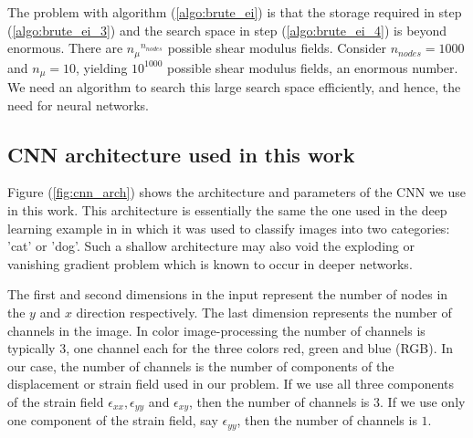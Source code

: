 \documentclass[12pt]{article}
\begin{document}
\vspace{4mm}
The problem with algorithm (\ref{algo:brute_ei}) is that the storage required in step (\ref{algo:brute_ei_3}) and the search space in step (\ref{algo:brute_ei_4}) is beyond enormous. There are ${n_{\mu}}^{n_{nodes}}$ possible shear modulus fields. Consider $n_{nodes}=1000$ and $n_{\mu}=10$, yielding $10^{1000}$ possible shear modulus fields, an enormous number. We need an algorithm to search this large search space efficiently, and hence, the need for neural networks.
\subsection{\label{sect:cnnarch} CNN architecture used in this work}
Figure (\ref{fig:cnn_arch}) shows the architecture and parameters of the CNN we use in this work. This architecture is essentially the same the one used in the deep learning example in \cite{misc:udemy} in which it was used to classify images into two categories: 'cat' or 'dog'. Such a shallow architecture may also void the exploding or vanishing gradient problem \cite{paper:bengioexplodgrad1994} which is known to occur in deeper networks.

The first and second dimensions in the input represent the number of nodes in the $y$ and $x$ direction respectively. The last dimension represents the number of channels in the image. In color image-processing the number of channels is typically $3$, one channel each for the three colors red, green and blue (RGB). In our case, the number of channels is the number of components of the displacement or strain field used in our problem. If we use all three components of the strain field $\epsilon_{xx},\epsilon_{yy}$ and $\epsilon_{xy}$, then the number of channels is $3$. If we use only one component of the strain field, say $\epsilon_{yy}$, then the number of channels is $1$.
\end{document}
